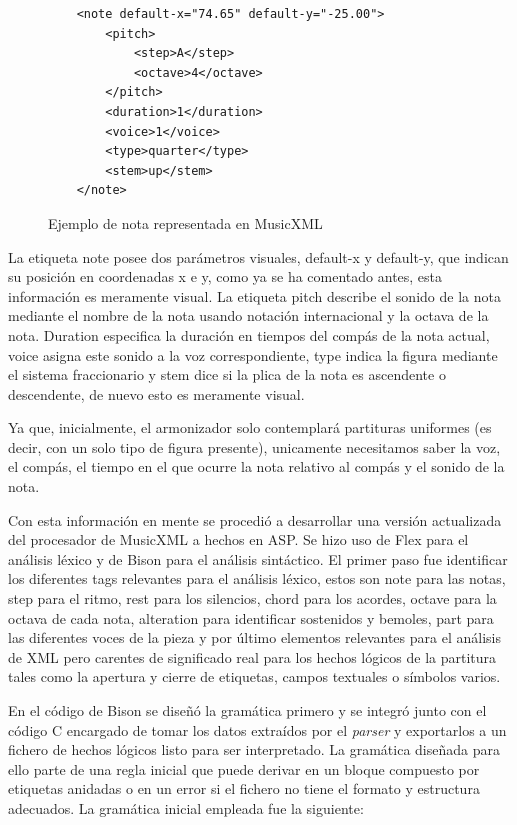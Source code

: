 \begin{figure}[h]
	\centering
	\begin{verbatim}
	<note default-x="74.65" default-y="-25.00">
	    <pitch>
	        <step>A</step>
	        <octave>4</octave>
	    </pitch>
	    <duration>1</duration>
	    <voice>1</voice>
	    <type>quarter</type>
	    <stem>up</stem>
	</note>
	\end{verbatim}
	\caption{Ejemplo de nota representada en MusicXML}
	\label{fig:nota_musicxml}
\end{figure}

La etiqueta note posee dos parámetros visuales, default-x y default-y,  que indican su posición en coordenadas x e y, como ya se ha comentado antes, esta información es meramente visual. La etiqueta pitch describe el sonido de la nota mediante el nombre de la nota usando notación internacional y la octava de la nota. Duration especifica la duración en tiempos del compás de la nota actual, voice asigna este sonido a la voz correspondiente, type indica la figura mediante el sistema fraccionario y stem dice si la plica de la nota es ascendente o descendente, de nuevo esto es meramente visual.

Ya que, inicialmente, el armonizador solo contemplará partituras uniformes (es decir, con un solo tipo de figura presente), unicamente necesitamos saber la voz, el compás, el tiempo en el que ocurre la nota relativo al compás y el sonido de la nota.

Con esta información en mente se procedió a desarrollar una versión actualizada del procesador de MusicXML a hechos en ASP. Se hizo uso de Flex para el análisis léxico y de Bison para el análisis sintáctico. El primer paso fue identificar los diferentes tags relevantes para el análisis léxico, estos son note para las notas, step para el ritmo, rest para los silencios, chord para los acordes, octave para la octava de cada nota, alteration para identificar sostenidos y bemoles, part para las diferentes voces de la pieza y por último elementos relevantes para el análisis de XML pero carentes de significado real para los hechos lógicos de la partitura tales como la apertura y cierre de etiquetas, campos textuales o símbolos varios.

En el código de Bison se diseñó la gramática primero y se integró junto con el código C encargado de tomar los datos extraídos por el \textit{parser} y exportarlos a un fichero de hechos lógicos listo para ser interpretado. La gramática diseñada para ello parte de una regla inicial que puede derivar en un bloque compuesto por etiquetas anidadas o en un error si el fichero no tiene el formato y estructura adecuados. La gramática inicial empleada fue la siguiente:


